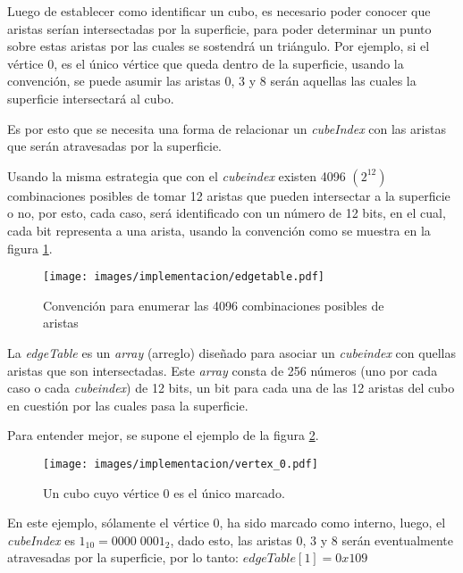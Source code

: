 Luego de establecer como identificar un cubo, es necesario poder conocer que aristas serían intersectadas por la superficie, para poder determinar un punto sobre estas aristas por las cuales se sostendrá un triángulo. Por ejemplo, si el vértice $0$, es el único vértice que queda dentro de la superficie, usando la convención, se puede asumir las aristas $0$, $3$ y $8$ serán aquellas las cuales la superficie intersectará al cubo.

Es por esto que se necesita una forma de relacionar un \emph{cubeIndex} con las aristas que serán atravesadas por la superficie.

Usando la misma estrategia que con el \emph{cubeindex} existen 4096 $(2^{12})$ combinaciones posibles de tomar 12 aristas que pueden intersectar a la superficie o no, por esto, cada caso, será identificado con un número de 12 bits, en el cual, cada bit representa a una arista, usando la convención como se muestra en la figura \ref{f:ch:implementacion:sec:CubeIndex:edgeTable:edge_convention}.

\begin{figure}[hbt]
	\centering
	\fbox
	{
		\texttt{[image: images/implementacion/edgetable.pdf]}
	}
	\caption{Convención para enumerar las 4096 combinaciones posibles de aristas}
	\label{f:ch:implementacion:sec:CubeIndex:edgeTable:edge_convention}
\end{figure}

La \emph{edgeTable} es un \emph{array} (arreglo) diseñado para asociar un \emph{cubeindex} con quellas aristas que son intersectadas. Este \emph{array} consta de 256 números (uno por cada caso o cada \emph{cubeindex}) de 12 bits, un bit para cada una de las 12 aristas del cubo en cuestión por las cuales pasa la superficie.

Para entender mejor, se supone el ejemplo de la figura \ref{f:ch:implementacion:sec:CubeIndex:edgeTable:example}.

\begin{figure}[hbt]
	\centering
	\fbox
	{
		\texttt{[image: images/implementacion/vertex\_0.pdf]}
	}
	\caption{Un cubo cuyo vértice $0$ es el único marcado.}
	\label{f:ch:implementacion:sec:CubeIndex:edgeTable:example}
\end{figure}

En este ejemplo, sólamente el vértice $0$, ha sido marcado como interno, luego, el \emph{cubeIndex} es $1_{10} = 0000 \; 0001_{2}$, dado esto, las aristas $0$, $3$ y $8$ serán eventualmente atravesadas por la superficie, por lo tanto: $edgeTable[1] = 0x109$


